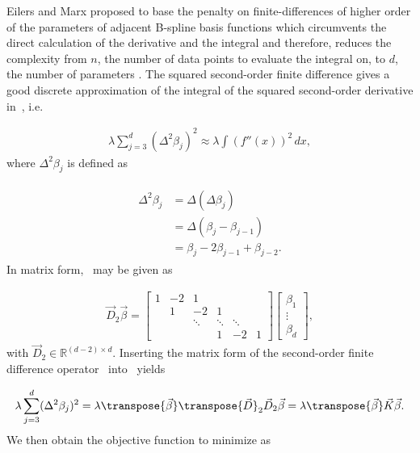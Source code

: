 Eilers and Marx proposed to base the penalty on finite-differences of higher order of the parameters of adjacent B-spline basis functions which circumvents the direct calculation of the derivative and the integral and therefore, reduces the complexity from $n$, the number of data points to evaluate the integral on, to $d$, the number of parameters \cite{eilers1996flexible}. The squared second-order finite difference gives a good discrete approximation of the integral of the squared second-order derivative in~, i.e.

\begin{align} \label{eq:wiggliness-finite-diff-approx}
	\lambda \sum_{j=3}^d (\Delta^2 \beta_j)^2 \approx \lambda \int (f''(x))^2 \,dx,
\end{align}
%
where $\Delta^2 \beta_j$ is defined as 

\begin{align} \label{eq:2nd-order-finite-diff}
	\begin{split}
		\Delta^2 \beta_j &= \Delta(\Delta \beta_j) \\
						 &= \Delta( \beta_j - \beta_{j-1}) \\
						 &= \beta_j - 2\beta_{j-1} + \beta_{j-2}.
	\end{split}
\end{align}
%
In matrix form,~ may be given as

\begin{align} \label{eq:2nd-order-finite-diff-matrix}
	\vec{D}_2 \vec{\beta} = 
					\begin{bmatrix} 
						1& -2& 1& &    \\  
						& 1 & -2 & 1& \\ 
						&  & \ddots & \ddots  & \ddots \\ 
						& & & 1 & -2 & 1 
					\end{bmatrix} \begin{bmatrix}
						\beta_1 \\
						\vdots \\
						\beta_d
				\end{bmatrix},
\end{align}
%
with $\vec{D}_2 \in \mathbb{R}^{(d-2) \times d}$. Inserting the matrix form of the second-order finite difference operator~ into~ yields

\begin{align}
	\lambda \sum_{j=3}^d (\Delta^2 \beta_j)^2 = \lambda \transpose{\vec{\beta}} \transpose{\vec{D}}_2 \vec{D}_2 \vec{\beta} = \lambda \transpose{\vec{\beta}} \vec{K} \vec{\beta}.
\end{align}
%
We then obtain the objective function to minimize as

